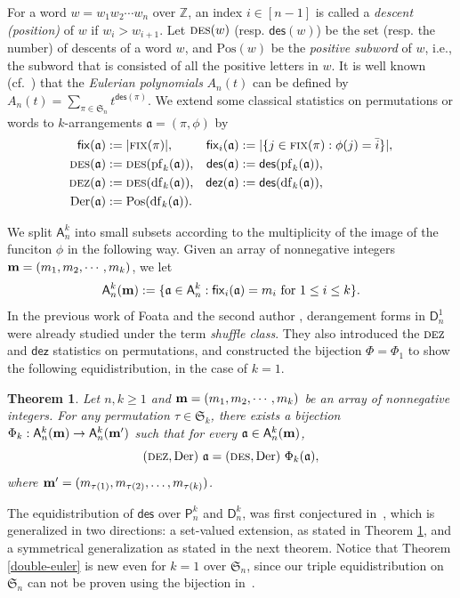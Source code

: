 \documentclass[12pt]{amsart}
\numberwithin{equation}{section}
\theoremstyle{plain}
\newtheorem{theorem}{Theorem}[section]
\theoremstyle{definition}
\newcommand{\Z}{\mathbb{Z}}
\newcommand\A{\mathsf{A}}
\renewcommand\P{\mathsf{P}}
\newcommand\D{\mathsf{D}}
\def\dez{\mathsf{dez}}
\def\Der{\mathrm{Der}}
\def\DES{\hbox{\rm\textsc{des}}}
\def\DEZ{\hbox{\rm\textsc{dez}}}
\def\Pos{\mathrm{Pos}}
\def\Fix{\hbox{\rm\textsc{fix}}}
\def\fix{\mathsf{fix}}
\def\des{\mathsf{des}}
\def\S{\mathfrak{S}}
\def\a{\mathfrak{a}}
\def\df{\operatorname{df}}
\def\pf{\operatorname{pf}}
\def\neg#1{{{{\bar#1}}}}
\begin{document}
For a word $w=w_1w_2\cdots w_n$ over $\Z$, an index $i\in[n-1]$ is called a 
{\it descent (position)} of $w$ if $w_i>w_{i+1}$. 
Let $\DES(w)$ (resp. $\des(w)$) be the set (resp. the number) of descents of a word $w$, and $\Pos(w)$ be the {\em positive subword} of $w$, i.e., the subword that is consisted of all the positive letters in $w$. It is well known (cf.~\cite{fs}) that the {\em Eulerian polynomials} $A_n(t)$ can be defined by
$ A_n(t)=\sum_{\pi\in\S_n}t^{\des(\pi)} $.
We extend some classical statistics on 
permutations or words
to  $k$-arrangements $\a=(\pi, \phi)$ by 
\begin{align*}
\fix(\a)&:=|\Fix(\pi)|, & \fix_i(\a)&:=|\{j\in\Fix(\pi):\phi(j)=\neg i\}|, \\
\DES(\a)&:=\DES(\pf_k(\a)), &     \des(\a)&:=\des(\pf_k(\a)),\\
\DEZ(\a)&:=\DES(\df_k(\a)),  &    \dez(\a)&:=\des(\df_k(\a)),\\
\Der(\a)&:=\Pos(\df_k(\a)).  &
\end{align*}

We split $\A_n^k$ into small subsets according to the multiplicity of the image of the funciton $\phi$ in the following way.
Given an array of nonnegative integers ${\bf m}=(m_1, m_2, \cdots, m_k)$,
we let 
$$
\A_n^k({\bf m}) := \{
	\a \in \A_n^k : \fix_i(\a)=m_i  \text{\ for $1\leq i\leq k$}
\}.
$$
In the previous work of Foata and the second author \cite{fh1,fh3},  derangement forms in $\D_n^1$ were already studied under the term {\em shuffle class}.
They also introduced the $\DEZ$ and $\dez$ statistics on permutations,
and constructed the bijection $\Phi=\Phi_1$ to show the following equidistribution, in the case of $k=1$.

\begin{theorem}\label{euler:k-set}
Let $n,k\geq1$ and 
${\bf m}=(m_1, m_2, \cdots, m_k)$ be an array of nonnegative integers.
For any permutation $\tau\in \S_k$,
	there exists a bijection $\Phi_k: \A_n^k({\bf m}) \rightarrow \A_n^k({\bf m'})$ such that for every $\a\in\A_n^k(\bf m)$,
\begin{equation}\label{eq:equieuler}
(\DEZ,  \Der)~\a = (\DES,  \Der)~\Phi_k(\a),
\end{equation}
	where ${\bf m'} = (m_{\tau(1)}, m_{\tau(2)}, \ldots, m_{\tau(k)})$.
\end{theorem}
The equidistribution of $\des$ over
$\P_n^k$ and $\D_n^k$, 
was first conjectured in~\cite[Conj.~1]{bs}, 
which is generalized in two directions:
a set-valued extension, as stated in
Theorem \ref{euler:k-set},  
and a symmetrical
generalization as stated in the next theorem.
Notice that Theorem \ref{double-euler}
is new even for $k=1$ over $\S_n$, since our triple
equidistribution on $\S_n$ can not be proven using the bijection in~\cite[Thm.~1.1]{fh1}.
\end{document}

